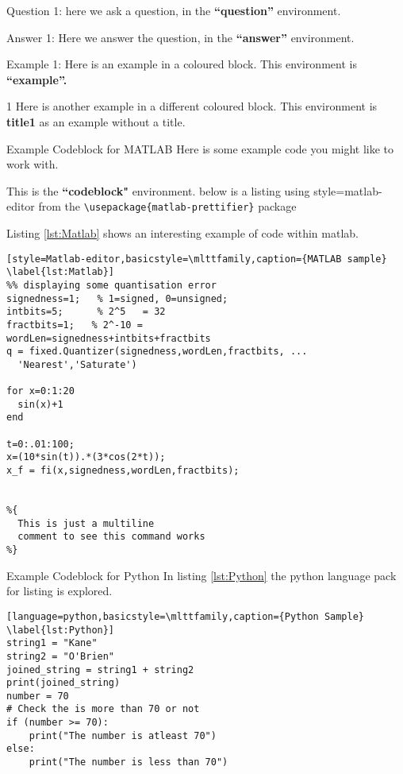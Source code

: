 \begin{question}{Question 1:}
  here we ask a question, in the \textbf{``question''} environment.
\end{question}

\begin{answer}{Answer 1:}
Here we answer the question, in the \textbf{``answer''} environment.
\end{answer}

\begin{example}{Example 1:}
Here is an example in a coloured block. This environment is \textbf{``example''.}
\end{example}

\begin{title1}{1}
Here is another example in a different coloured block. This environment is \textbf{title1} as an example without a title.
\end{title1}

\begin{codeblock}{Example Codeblock for MATLAB}
Here is some example code you might like to work with.

This is the \textbf{``codeblock"} environment. below is a listing using style=matlab-editor from the \verb|\usepackage{matlab-prettifier}| package

Listing \ref{lst:Matlab} shows an interesting example of code within matlab.
\begin{lstlisting}[style=Matlab-editor,basicstyle=\mlttfamily,caption={MATLAB sample} \label{lst:Matlab}]
%% displaying some quantisation error
signedness=1;   % 1=signed, 0=unsigned;
intbits=5;      % 2^5   = 32
fractbits=1;   % 2^-10 =
wordLen=signedness+intbits+fractbits
q = fixed.Quantizer(signedness,wordLen,fractbits, ...
  'Nearest','Saturate')

for x=0:1:20
  sin(x)+1
end

t=0:.01:100;
x=(10*sin(t)).*(3*cos(2*t));
x_f = fi(x,signedness,wordLen,fractbits);


%{
  This is just a multiline
  comment to see this command works
%}
\end{lstlisting}
\end{codeblock}



\begin{codeblock}{Example Codeblock for Python}
In listing \ref{lst:Python} the python language pack for listing is explored.

\begin{lstlisting}[language=python,basicstyle=\mlttfamily,caption={Python Sample} \label{lst:Python}]
string1 = "Kane"
string2 = "O'Brien"
joined_string = string1 + string2
print(joined_string)
number = 70
# Check the is more than 70 or not
if (number >= 70):
    print("The number is atleast 70")
else:
    print("The number is less than 70")
\end{lstlisting}
\end{codeblock}
\clearpage
